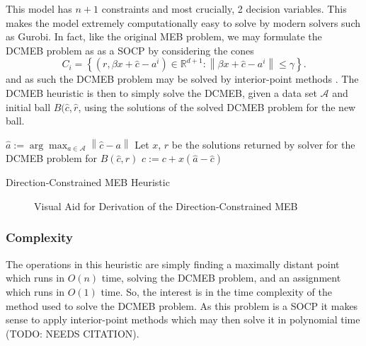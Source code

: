 \documentclass[11pt,twoside]{report}
\newcommand{\A}{\mathcal{A}} %
\newcommand{\norm}[1]{\left\lVert#1\right\rVert} %
\theoremstyle{definition}
\numberwithin{theorem}{section}
\numberwithin{definition}{section}
\numberwithin{lemma}{section}
\numberwithin{proposition}{section}
\numberwithin{equation}{section}
\numberwithin{figure}{section}
\begin{document}
This model has $n+1$ constraints and most crucially, 2 decision variables. This makes the model extremely computationally easy to solve by modern solvers such as Gurobi. In fact, like the original MEB problem, we may formulate the DCMEB problem as as a SOCP by considering the cones
\begin{equation*}
    C_i = \left\{(r,\beta x+\hat{c}-a^i) \in \mathbb{R}^{d+1}: \norm{\beta x +\hat{c}-a^i}\leq\gamma\right\}.
\end{equation*}
and as such the DCMEB problem may be solved by interior-point methods \cite{socp_ipm}. The DCMEB heuristic is then to simply solve the DCMEB, given a data set $\A$ and initial ball $B(\hat{c},\hat{r}$, using the solutions of the solved DCMEB problem for the new ball.

\begin{algorithm}[H]
    \KwIn{Data set $\A$, Ball $B(\hat{c},\hat{r}$)}
    $\hat{a}:=\arg\max_{a\in\A}\norm{\hat{c}-a}$\;
    Let $x$, $r$ be the solutions returned by solver for the DCMEB problem for $B(\hat{c},\hat{r})$\;
    $c:=c+x(\hat{a}-\hat{c})$\;
    \;
    \caption{Direction-Constrained MEB Heuristic}
\end{algorithm}

\begin{figure}
    \centering
    \caption{Visual Aid for Derivation of the Direction-Constrained MEB}
    \label{fig:dcmeb}
\end{figure}

\subsubsection{Complexity}

The operations in this heuristic are simply finding a maximally distant point which runs in $O(n)$ time, solving the DCMEB problem, and an assignment which runs in $O(1)$ time. So, the interest is in the time complexity of the method used to solve the DCMEB problem. As this problem is a SOCP it makes sense to apply interior-point methods which may then solve it in polynomial time (TODO: NEEDS CITATION).
\end{document}

